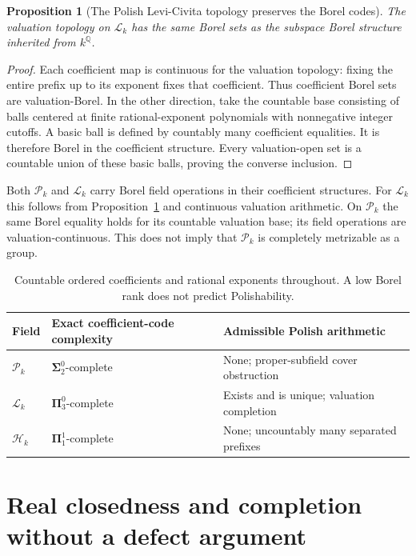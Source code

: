 \documentclass[11pt]{article}
\numberwithin{equation}{section}
\newtheorem{proposition}[proposition]{Proposition}
\theoremstyle{definition}
\theoremstyle{remark}
\newcommand{\Q}{\mathbb Q}
\newcommand{\Pk}{\mathcal P_k}
\newcommand{\Lk}{\mathcal L_k}
\newcommand{\Hk}{\mathcal H_k}
\newcommand{\Sf}{\boldsymbol{\Sigma}^{0}_{2}}
\newcommand{\Pt}{\boldsymbol{\Pi}^{0}_{3}}
\newcommand{\Pc}{\boldsymbol{\Pi}^{1}_{1}}
\begin{document}
\begin{proposition}[The Polish Levi-Civita topology preserves the Borel codes]
\label{pma:ser:prop:sameborel}
The valuation topology on $\Lk$ has the same Borel sets as the subspace
Borel structure inherited from $k^\Q$.
\end{proposition}
\begin{proof}
Each coefficient map is continuous for the valuation topology: fixing the
entire prefix up to its exponent fixes that coefficient. Thus coefficient
Borel sets are valuation-Borel.
In the other direction, take the countable base consisting of balls centered
at finite rational-exponent polynomials with nonnegative integer cutoffs.
A basic ball is defined by countably many coefficient equalities. It is
therefore Borel in the coefficient structure. Every valuation-open set is a
countable union of these basic balls, proving the converse inclusion.
\end{proof}

Both $\Pk$ and $\Lk$ carry Borel field operations in their coefficient
structures. For $\Lk$ this follows from Proposition~\ref{pma:ser:prop:sameborel} and
continuous valuation arithmetic. On $\Pk$ the same Borel equality holds for
its countable valuation base; its field operations are valuation-continuous.
This does not imply that $\Pk$ is completely metrizable as a group.

\begin{table}[ht]
\centering\small
\renewcommand{\arraystretch}{1.25}
\begin{tabularx}{\textwidth}{@{}l>{\raggedright\arraybackslash}X>{\raggedright\arraybackslash}X@{}}
\toprule
Field & Exact coefficient-code complexity & Admissible Polish arithmetic\\
\midrule
$\Pk$ & $\Sf$-complete & None; proper-subfield cover obstruction\\
$\Lk$ & $\Pt$-complete & Exists and is unique; valuation completion\\
$\Hk$ & $\Pc$-complete & None; uncountably many separated prefixes\\
\bottomrule
\end{tabularx}
\caption{Countable ordered coefficients and rational exponents throughout.
A low Borel rank does not predict Polishability.}
\label{pma:ser:tab:trichotomy}
\end{table}

\section{Real closedness and completion without a defect argument}
\label{pma:ser:sec:realclosed}
\end{document}
